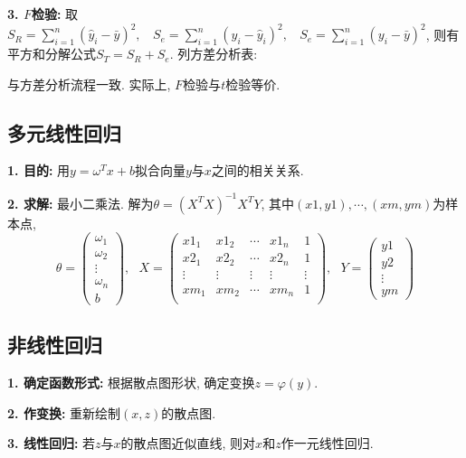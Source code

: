 \textbf{3. $F$检验: }取$S_R=\sum\limits_{i=1}^n (\hat{y}_i-\bar{y})^2,~~~~ S_e=\sum\limits_{i=1}^n (y_i-\hat{y}_i)^2,~~~~S_e=\sum\limits_{i=1}^n (y_i-\bar{y})^2$, 则有平方和分解公式$S_T=S_R+S_e$. 列方差分析表:
\begin{table}[H]
\end{table}
与方差分析流程一致. 实际上, $F$检验与$t$检验等价.

\subsection{多元线性回归}

\textbf{1. 目的: }用$y=\omega^Tx+b$拟合向量$y$与$x$之间的相关关系.

\textbf{2. 求解: }最小二乘法. 解为$\theta=(X^TX)^{-1}X^TY$, 其中$(x1,y1),\cdots,(xm,ym)$为样本点, 
\begin{equation*}
    \theta=\begin{pmatrix}
        \omega_1\\
        \omega_2\\
        \vdots\\
        \omega_n\\
        b
    \end{pmatrix}, ~~~X=\begin{pmatrix}
        x1_1&x1_2&\cdots&x1_n&1\\
        x2_1&x2_2&\cdots&x2_n&1\\
        \vdots&\vdots&\vdots&\vdots&\vdots\\
        xm_1&xm_2&\cdots&xm_n&1\\
    \end{pmatrix},~~~Y=\begin{pmatrix}
        y1\\
        y2\\
        \vdots\\
        ym
    \end{pmatrix}
\end{equation*}

\subsection{非线性回归}

\textbf{1. 确定函数形式: }根据散点图形状, 确定变换$z=\varphi(y)$.

\textbf{2. 作变换: }重新绘制$(x,z)$的散点图.

\textbf{3. 线性回归: }若$z$与$x$的散点图近似直线, 则对$x$和$z$作一元线性回归.